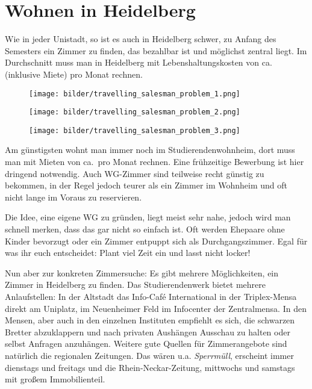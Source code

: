 
\section{Wohnen in Heidelberg}

Wie in jeder Unistadt, so ist es auch in Heidelberg schwer, zu Anfang des Semesters ein Zimmer zu finden, das bezahlbar ist und möglichst zentral liegt. Im Durchschnitt muss man in Heidelberg mit Lebenshaltungskosten von ca. \lebenshaltungskosten (inklusive Miete) pro Monat rechnen.

\begin{figure*}[t]
    \centering
    \begin{subfigure}{.3\textwidth}
        \texttt{[image: bilder/travelling\_salesman\_problem\_1.png]}
    \end{subfigure}
    \begin{subfigure}{.3\textwidth}
        \texttt{[image: bilder/travelling\_salesman\_problem\_2.png]}
    \end{subfigure}
    \begin{subfigure}{.3\textwidth}
        \texttt{[image: bilder/travelling\_salesman\_problem\_3.png]}
    \end{subfigure}
\end{figure*}

Am günstigsten wohnt man immer noch im Studierendenwohnheim, dort muss man mit Mieten von ca.~\studentenwohnheim pro Monat rechnen. Eine frühzeitige Bewerbung ist hier dringend notwendig. Auch WG-Zimmer sind teilweise recht günstig zu bekommen, in der Regel jedoch teurer als ein Zimmer im Wohnheim und oft nicht lange im Voraus zu reservieren.

Die Idee, eine eigene WG zu gründen, liegt meist sehr nahe, jedoch wird man schnell merken, dass das gar nicht so einfach ist. Oft werden Ehepaare ohne Kinder bevorzugt oder ein Zimmer entpuppt sich als Durchgangszimmer. Egal für was ihr euch entscheidet: Plant viel Zeit ein und lasst nicht locker!

Nun aber zur konkreten Zimmersuche: Es gibt mehrere Möglichkeiten, ein Zimmer in Heidelberg zu finden. Das Studierendenwerk bietet mehrere Anlaufstellen: In der Altstadt das Info-Café International in der Triplex-Mensa direkt am Uniplatz, im Neuenheimer Feld im Infocenter der Zentralmensa. In den Mensen, aber auch in den einzelnen Instituten empfiehlt es sich, die schwarzen Bretter abzuklappern und nach privaten Aushängen Ausschau zu halten oder selbst Anfragen anzuhängen. Weitere gute Quellen für Zimmerangebote sind natürlich die regionalen Zeitungen. Das wären u.a. \emph{Sperrmüll}, erscheint immer dienstags und freitags und die Rhein-Neckar-Zeitung, mittwochs und samstags mit großem Immobilienteil. %


